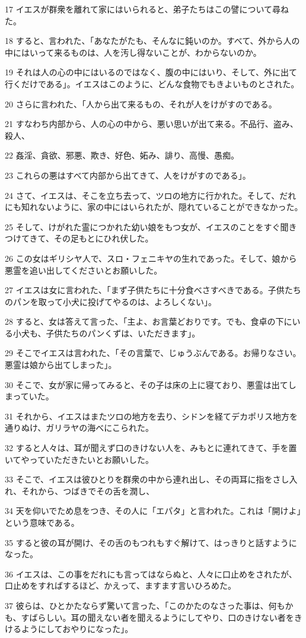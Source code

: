 \par 17 イエスが群衆を離れて家にはいられると、弟子たちはこの譬について尋ねた。
\par 18 すると、言われた、「あなたがたも、そんなに鈍いのか。すべて、外から人の中にはいって来るものは、人を汚し得ないことが、わからないのか。
\par 19 それは人の心の中にはいるのではなく、腹の中にはいり、そして、外に出て行くだけである」。イエスはこのように、どんな食物でもきよいものとされた。
\par 20 さらに言われた、「人から出て来るもの、それが人をけがすのである。
\par 21 すなわち内部から、人の心の中から、悪い思いが出て来る。不品行、盗み、殺人、
\par 22 姦淫、貪欲、邪悪、欺き、好色、妬み、誹り、高慢、愚痴。
\par 23 これらの悪はすべて内部から出てきて、人をけがすのである」。
\par 24 さて、イエスは、そこを立ち去って、ツロの地方に行かれた。そして、だれにも知れないように、家の中にはいられたが、隠れていることができなかった。
\par 25 そして、けがれた霊につかれた幼い娘をもつ女が、イエスのことをすぐ聞きつけてきて、その足もとにひれ伏した。
\par 26 この女はギリシヤ人で、スロ・フェニキヤの生れであった。そして、娘から悪霊を追い出してくださいとお願いした。
\par 27 イエスは女に言われた、「まず子供たちに十分食べさすべきである。子供たちのパンを取って小犬に投げてやるのは、よろしくない」。
\par 28 すると、女は答えて言った、「主よ、お言葉どおりです。でも、食卓の下にいる小犬も、子供たちのパンくずは、いただきます」。
\par 29 そこでイエスは言われた、「その言葉で、じゅうぶんである。お帰りなさい。悪霊は娘から出てしまった」。
\par 30 そこで、女が家に帰ってみると、その子は床の上に寝ており、悪霊は出てしまっていた。
\par 31 それから、イエスはまたツロの地方を去り、シドンを経てデカポリス地方を通りぬけ、ガリラヤの海べにこられた。
\par 32 すると人々は、耳が聞えず口のきけない人を、みもとに連れてきて、手を置いてやっていただきたいとお願いした。
\par 33 そこで、イエスは彼ひとりを群衆の中から連れ出し、その両耳に指をさし入れ、それから、つばきでその舌を潤し、
\par 34 天を仰いでため息をつき、その人に「エパタ」と言われた。これは「開けよ」という意味である。
\par 35 すると彼の耳が開け、その舌のもつれもすぐ解けて、はっきりと話すようになった。
\par 36 イエスは、この事をだれにも言ってはならぬと、人々に口止めをされたが、口止めをすればするほど、かえって、ますます言いひろめた。
\par 37 彼らは、ひとかたならず驚いて言った、「このかたのなさった事は、何もかも、すばらしい。耳の聞えない者を聞えるようにしてやり、口のきけない者をきけるようにしておやりになった」。


